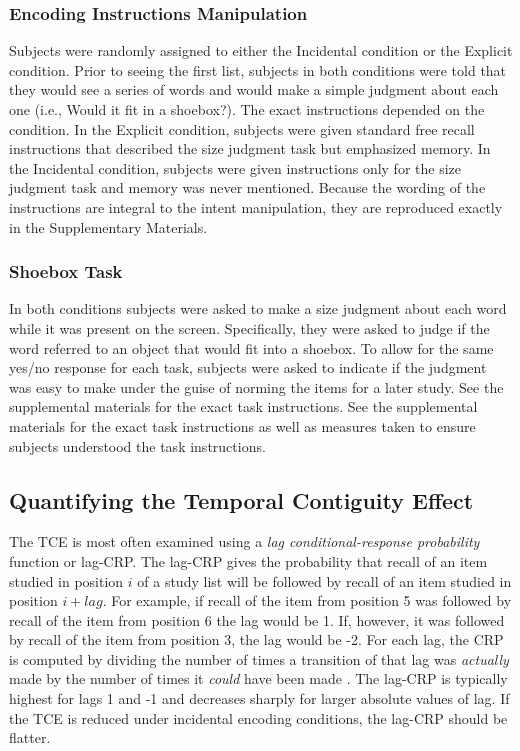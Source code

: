 \documentclass[man,natbib,floatsintext]{apa6} %
\begin{document}
\subsubsection{Encoding Instructions Manipulation} Subjects were randomly assigned to either the Incidental condition or the Explicit condition. Prior to seeing the first list, subjects in both conditions were told that they would see a series of words and would make a simple judgment about each one (i.e., Would it fit in a shoebox?). The exact instructions depended on the condition. In the Explicit condition, subjects were given standard free recall instructions that described the size judgment task but emphasized memory. In the Incidental condition, subjects were given instructions only for the size judgment task and memory was never mentioned. Because the wording of the instructions are integral to the intent manipulation, they are reproduced exactly in the Supplementary Materials.

\subsubsection{Shoebox Task} In both conditions subjects were asked to make a size judgment about each word while it was present on the screen. Specifically, they were asked  to judge if the word referred to an object that would fit into a shoebox. To allow for the same yes/no response for each task, subjects were asked to indicate if the judgment was easy to make under the guise of norming the items for a later study. See the supplemental materials for the exact task instructions. See the supplemental materials for the exact task instructions as well as measures taken to ensure subjects understood the task instructions.

\subsection{Quantifying the Temporal Contiguity Effect} The TCE is most often examined using a \textit{lag conditional-response probability} function or lag-CRP. The lag-CRP gives the probability that recall of an item studied in position $i$ of a study list will be followed by recall of an item studied in position $i+lag$. For example, if recall of the item from position 5 was followed by recall of the item from position 6 the lag would be 1. If, however, it was followed by recall of the item from position 3, the lag would be -2. For each lag, the CRP is computed by dividing the number of times a transition of that lag was \emph{actually} made by the number of times it \emph{could} have been made \citep[e.g., it could not have been made if the item $i+lag$ was already recalled;][]{Kaha96}. The lag-CRP is typically highest for lags 1 and -1 and decreases sharply for larger absolute values of lag. If the TCE is reduced under incidental encoding conditions, the lag-CRP should be flatter.
\end{document}
